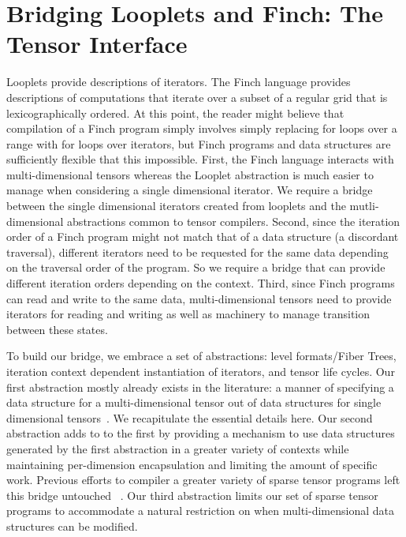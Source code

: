 \section{Bridging Looplets and Finch: The Tensor Interface}
Looplets provide descriptions of iterators. 
%
The Finch language provides descriptions of computations that iterate over a subset of a regular grid that is lexicographically ordered.
%
At this point, the reader might believe that compilation of a Finch program simply involves simply replacing for loops over a range with for loops over iterators, but Finch programs and data structures are sufficiently flexible that this impossible.
%
First, the Finch language interacts with multi-dimensional tensors whereas the Looplet abstraction is much easier to manage when considering a single dimensional iterator. 
%
We require a bridge between the single dimensional iterators created from looplets and the mutli-dimensional abstractions common to tensor compilers.
%
Second, since the iteration order of a Finch program might not match that of a data structure (a discordant traversal), different iterators need to be requested for the same data depending on the traversal order of the program.
%
So we require a bridge that can provide different iteration orders depending on the context.
%
Third, since Finch programs can read and write to the same data, multi-dimensional tensors need to provide iterators for reading and writing as well as machinery to manage transition between these states.

To build our bridge, we embrace a set of abstractions: level formats/Fiber Trees, iteration context dependent instantiation of iterators, and tensor life cycles.
%
Our first abstraction mostly already exists in the literature: a manner of specifying a data structure for a multi-dimensional tensor out of data structures for single dimensional tensors~\cite{sze2017efficient,chou2022compilation, chou2018format}. 
%
We recapitulate the essential details here.
%
Our second abstraction adds to to the first by providing a mechanism to use data structures generated by the first abstraction in a greater variety of contexts while maintaining per-dimension encapsulation and limiting the amount of specific work.
%
Previous efforts to compiler a greater variety of sparse tensor programs left this bridge untouched ~\cite{henry2021compilation, won2023unified}.
%
Our third abstraction limits our set of sparse tensor programs to accommodate a natural restriction on when multi-dimensional data structures can be modified.
%

